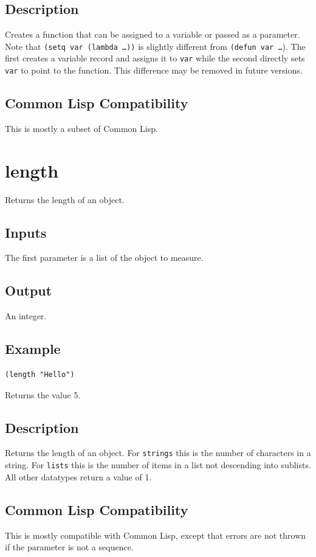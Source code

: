 \documentclass[10pt, openany]{book}
\newcommand{\keyword}[1]{\texttt{#1}}
\newcommand{\datatype}[1]{\texttt{#1}}
\newcommand{\cl}{Common Lisp}
\begin{document}
\subsection{Description}
Creates a function that can be assigned to a variable or passed as a parameter.  Note that \keyword{(setq var (lambda \dots))} is slightly different from \keyword{(defun var \dots}).  The first creates a variable record and assigns it to \keyword{var} while the second directly sets \keyword{var} to point to the function.  This difference may be removed in future versions.
\subsection{Common Lisp Compatibility}
This is mostly a subset of \cl.

\section{length}
Returns the length of an object.
\subsection{Inputs}
The first parameter is a list of the object to measure.
\subsection{Output}
An integer.
\subsection{Example}
\begin{lstlisting}
(length "Hello")
\end{lstlisting}
Returns the value 5.
\subsection{Description}
Returns the length of an object.  For \datatype{strings} this is the number of characters in a string.  For \datatype{lists} this is the number of items in a list not descending into sublists.  All other datatypes return a value of 1.
\subsection{Common Lisp Compatibility}
This is mostly compatible with \cl, except that errors are not thrown if the parameter is not a sequence.
\end{document}
